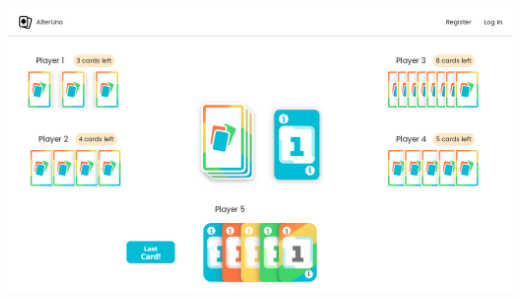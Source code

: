 \begin{center}
  \includegraphics[width=1\textwidth]{img/Mockup Game}
   \label{fig:gamemockup}
\end{center}


